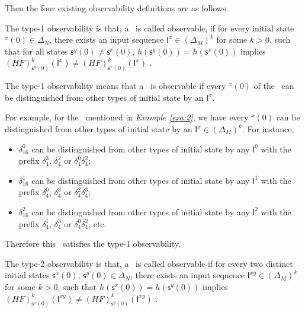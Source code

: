 Then the four existing observability definitions are as follows.

\begin{definition} 
The type-1 observability is that, a \BCN\ is called observable, if for every initial state \State$^{x}(0)$$\in \Delta_N$, there exists an input sequence $\mathsf{I}^x\in(\Delta_M)^k$ for some $k>0$, such that for all states $\mathsf{s}^{y}(0)\neq \mathsf{s}^{x}(0)$, $h(\mathsf{s}^{y}(0))=h(\mathsf{s}^{x}(0))$ implies $(HF)^k_{\mathsf{s}^{y}(0)}(\mathsf{I}^x)\neq (HF)^k_{{\mathsf{s}^{x}(0)}}(\mathsf{I}^x)$ \cite{cheng2009controllability}.
\end{definition}

The  type-1 observability means that a \BCN\ is observable if every \State$^{x}(0)$ of the \BCN\ can be distinguished from other types of initial state by an $\mathsf{I}^x$. %
\begin{example}
For example, for the \BCN\ mentioned in {\em Example \ref{exa:2}}, we have every \State$^{x}(0)$ can be distinguished from other types of initial state by an $\mathsf{I}^x \in(\Delta_M)^k$.  For instance,
\begin{itemize}
  \item $\delta_{16}^0$ can be distinguished from other types of initial state by any $\mathsf{I}^0$ with the prefix $\delta_{4}^3$, $\delta_{4}^2$ or $\delta_{4}^0  \delta_{4}^2$;
  \item $\delta_{16}^1$ can be distinguished from other types of initial state by any $\mathsf{I}^1$ with the prefix $\delta_{4}^0$, $\delta_{4}^3$ or $\delta_{4}^2 \delta_{4}^3$;
  \item $\delta_{16}^2$ can be distinguished from other types of initial state by any $\mathsf{I}^2$ with the prefix $\delta_{4}^1$, $\delta_{4}^3$ or $\delta_{4}^0 \delta_{4}^2$, etc.
\end{itemize} 
Therefore this \BCN\ satisfies the  type-1 observability.
\label{exa:4}
\end{example}   

\begin{definition}
	The  type-2 observability is that, a \BCN\ is called observable if for every two distinct initial states $\mathsf{s}^{x}(0)$, $\mathsf{s}^{y}(0) \in \Delta_N$, there exists an input sequence $\mathsf{I}^{xy}\in(\Delta_M)^k$ for some $k>0$, such that $h(\mathsf{s}^{x}(0))=h(\mathsf{s}^{y}(0))$ implies $(HF)^k_{\mathsf{s}^{x}(0)}(\mathsf{I}^{xy})\neq (HF)^k_{\mathsf{s}^{y}(0)}(\mathsf{I}^{xy})$ \cite{Zhao2010Input}.
\end{definition}

